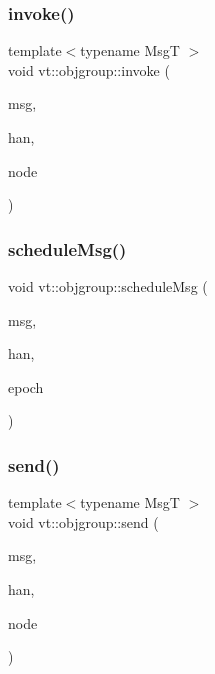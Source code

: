 \subsubsection{\texorpdfstring{invoke()}{invoke()}}
{\footnotesize\ttfamily template$<$typename MsgT $>$ \\
void vt\+::objgroup\+::invoke (\begin{DoxyParamCaption}\item[{\hyperlink{structvt_1_1messaging_1_1_msg_ptr_thief}{messaging\+::\+Msg\+Ptr\+Thief}$<$ MsgT $>$}]{msg,  }\item[{\hyperlink{namespacevt_af64846b57dfcaf104da3ef6967917573}{Handler\+Type}}]{han,  }\item[{\hyperlink{namespacevt_a866da9d0efc19c0a1ce79e9e492f47e2}{Node\+Type}}]{node }\end{DoxyParamCaption})}

\mbox{\label{namespacevt_1_1objgroup_ab154142df9cf5401462e1b4cabb3b480}} 
\subsubsection{\texorpdfstring{schedule\+Msg()}{scheduleMsg()}}
{\footnotesize\ttfamily void vt\+::objgroup\+::schedule\+Msg (\begin{DoxyParamCaption}\item[{\hyperlink{namespacevt_ab2b3d506ec8e8d1540aede826d84a239}{Msg\+Shared\+Ptr}$<$ \hyperlink{namespacevt_a1125ac1da6c0bbf141e0ea0739d7602d}{Short\+Message} $>$}]{msg,  }\item[{\hyperlink{namespacevt_af64846b57dfcaf104da3ef6967917573}{Handler\+Type}}]{han,  }\item[{\hyperlink{namespacevt_a985a5adf291c34a3ca263b3378388236}{Epoch\+Type}}]{epoch }\end{DoxyParamCaption})}

\mbox{\label{namespacevt_1_1objgroup_aa2e134493c6b8a23d7d5e86bd9df1a70}} 
\subsubsection{\texorpdfstring{send()}{send()}}
{\footnotesize\ttfamily template$<$typename MsgT $>$ \\
void vt\+::objgroup\+::send (\begin{DoxyParamCaption}\item[{\hyperlink{namespacevt_ab2b3d506ec8e8d1540aede826d84a239}{Msg\+Shared\+Ptr}$<$ MsgT $>$}]{msg,  }\item[{\hyperlink{namespacevt_af64846b57dfcaf104da3ef6967917573}{Handler\+Type}}]{han,  }\item[{\hyperlink{namespacevt_a866da9d0efc19c0a1ce79e9e492f47e2}{Node\+Type}}]{node }\end{DoxyParamCaption})}

